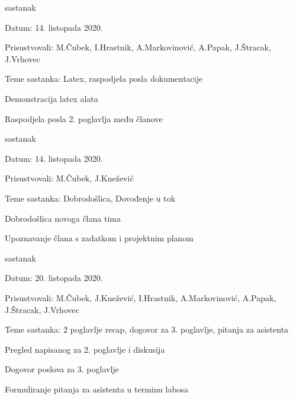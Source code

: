\begin{packed_enum}
			\item  sastanak
			\item[] \begin{packed_item}
				\item Datum: 14. listopada 2020.
				\item Prisustvovali: M.Čubek, I.Hrastnik, A.Markovinović, A.Papak, J.Štracak, J.Vrhovec
				\item Teme sastanka: Latex, raspodjela posla dokumentacije
				\begin{packed_item}
					\item  Demonstracija latex alata
					\item  Raspodjela posla 2. poglavlja među članove
				\end{packed_item}
			\end{packed_item}
		
			\item  sastanak
			\item[] \begin{packed_item}
				\item Datum: 14. listopada 2020.
				\item Prisustvovali: M.Čubek, J.Knežević
				\item Teme sastanka: Dobrodošlica, Dovođenje u tok
				\begin{packed_item}
					\item  Dobrodošlica novoga člana tima
					\item  Upoznavanje člana s zadatkom i projektnim planom
				\end{packed_item}
			\end{packed_item}
		
			\item  sastanak
			\item[] \begin{packed_item}
				\item Datum: 20. listopada 2020.
				\item Prisustvovali: M.Čubek, J.Knežević, I.Hrastnik, A.Markovinović, A.Papak, J.Štracak, J.Vrhovec
				\item Teme sastanka: 2 poglavlje recap, dogovor za 3. poglavlje, pitanja za asistenta
				\begin{packed_item}
					\item  Pregled napisanog za 2. poglavlje i diskusija
					\item  Dogovor poslova za 3. poglavlje
					\item  Formuliranje pitanja za asistenta u terminu labosa
				\end{packed_item}
			\end{packed_item}
		

\end{packed_enum}
